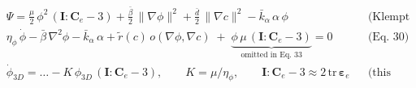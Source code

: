 \documentclass[border=4pt]{standalone}
\begin{document}
$\displaystyle
\begin{aligned}
&\Psi=\frac{\mu}{2}\,\phi^2\,(\mathbf I:\mathbf C_e-3)+\frac{\bar\beta}{2}\,\|\nabla\phi\|^2+\frac{\bar d}{2}\,\|\nabla c\|^2-\bar k_\alpha\,\alpha\,\phi
&&\text{(Klempt 2024, Eq.~20)}\\[4pt]
&\eta_\phi\,\dot\phi-\bar\beta\,\nabla^2\phi-\bar k_\alpha\,\alpha+\tilde r(c)\,o(\nabla\phi,\nabla c)\;+\;\underbrace{\phi\,\mu\,(\mathbf I:\mathbf C_e-3)}_{\text{omitted in Eq.~33}}=0
&&\text{(Eq.~30)}\\[4pt]
&\dot\phi_{3D}=\dots-K\,\phi_{3D}\,(\mathbf I:\mathbf C_e-3),\qquad K=\mu/\eta_\phi,\qquad \mathbf I:\mathbf C_e-3\approx 2\,\mathrm{tr}\,\bm\varepsilon_e
&&\text{(this work)}
\end{aligned}$
\end{document}
